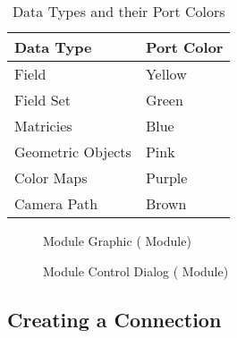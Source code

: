 \begin{table}[htbp]
  \begin{center}
    \begin{tabular}{|l|l|}
      \hline
      \textbf{Data Type} & \textbf{Port Color} \\
      \hline
      Field & Yellow \\
      Field Set & Green \\
      Matricies & Blue \\
      Geometric Objects & Pink \\
      Color Maps & Purple \\
      Camera Path & Brown \\
      \hline
    \end{tabular}
    \caption{Data Types and their Port Colors}
    \label{tab:portcolors}
  \end{center}
\end{table}


\begin{figure}[htb]
  \begin{makeimage}
  \end{makeimage}
  \modgraphic
  \caption{\label{fig:modgraphic} Module Graphic ( Module)}
\end{figure}

\begin{figure}[htb]
  \begin{makeimage}
  \end{makeimage}
  \moddialog
  \caption{\label{fig:moddialog} Module Control Dialog ( Module)}
\end{figure}

\subsection{Creating a Connection}
\label{sec:connectmods}

